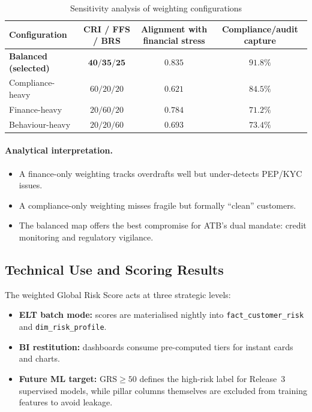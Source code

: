 \begin{table}[H]
\centering
\caption{Sensitivity analysis of weighting configurations}
\label{tab:weights-sensitivity}
\renewcommand{\arraystretch}{1.2}
\scriptsize
\begin{tabular}{|p{4.0cm}|c|c|c|}
\hline
\rowcolor{blue!15}
\textbf{Configuration} & \textbf{CRI / FFS / BRS} & \textbf{Alignment with financial stress} & \textbf{Compliance/audit capture} \\
\hline
\textbf{Balanced (selected)} & $\mathbf{40/35/25}$ & $\mathbf{0.835}$ & $\mathbf{91.8\%}$ \\
\hline
Compliance-heavy & $60/20/20$ & $0.621$ & $84.5\%$ \\
\hline
Finance-heavy & $20/60/20$ & $0.784$ & $71.2\%$ \\
\hline
Behaviour-heavy & $20/20/60$ & $0.693$ & $73.4\%$ \\
\hline
\end{tabular}
\end{table}

\paragraph{Analytical interpretation.}
\begin{itemize}
    \item A finance-only weighting tracks overdrafts well but under-detects PEP/KYC
          issues.
    \item A compliance-only weighting misses fragile but formally ``clean'' customers.
    \item The balanced map offers the best compromise for ATB's dual mandate: credit
          monitoring and regulatory vigilance.
\end{itemize}

\subsection{Technical Use and Scoring Results}
The weighted Global Risk Score acts at three strategic levels:
\begin{itemize}
    \item \textbf{ELT batch mode:} scores are materialised nightly into
          \texttt{fact\_customer\_risk} and \texttt{dim\_risk\_profile}.
    \item \textbf{BI restitution:} dashboards consume pre-computed tiers for instant
          cards and charts.
    \item \textbf{Future ML target:} $\mathrm{GRS}\ge 50$ defines the high-risk label
          for Release~3 supervised models, while pillar columns themselves are
          excluded from training features to avoid leakage.
\end{itemize}

